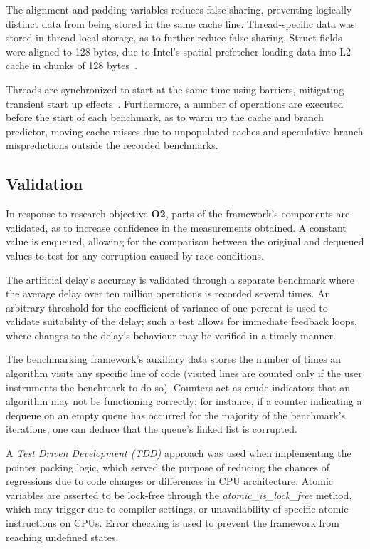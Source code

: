 The alignment and padding variables reduces false sharing, preventing logically
distinct data from being stored in the same cache line.
Thread-specific data was stored in thread local storage, as to further reduce
false sharing. Struct fields were aligned to 128 bytes, due to
Intel's spatial prefetcher loading data into L2
cache in chunks of 128 bytes~\citep[Section~E.2.5.4]{intelmanualoptimization}.

Threads are synchronized to start at the same time using
barriers, mitigating transient start up effects~\citep{hoffman2007baskets}.
Furthermore, a number of operations are executed before the start of each
benchmark, as to warm up the cache and branch predictor, moving cache misses
due to unpopulated caches and speculative branch mispredictions outside the
recorded benchmarks.

\subsection{Validation\label{sec:design_and_implementation_validation}}
In response to research objective \textbf{O2}, parts of the framework's
components are validated, as to increase confidence in the measurements
obtained. A constant value is enqueued, allowing for the comparison
between the original and dequeued values to test for any corruption caused by race conditions. 

The artificial delay's accuracy is validated through a separate
benchmark where the average delay over ten million operations is recorded several times.
An arbitrary threshold for the coefficient of variance of one percent is used
to validate suitability of the delay; such a test allows for immediate feedback
loops, where changes to the delay's behaviour may be verified in a timely
manner.

The benchmarking framework's auxiliary data stores the number of times an
algorithm visits any specific line of code (visited lines are counted only if
the user instruments the benchmark to do so). Counters act as crude indicators that an
algorithm may not be functioning correctly; for instance, if a counter indicating a
dequeue on an empty queue has occurred for the majority of the benchmark's
iterations, one can deduce that the queue's linked list is corrupted. 

A \emph{Test Driven Development (TDD)} approach was used when implementing the
pointer packing logic, which served the purpose of reducing the chances of
regressions due to code changes or differences in CPU architecture. Atomic
variables are asserted to be lock-free through the
\emph{atomic\_is\_lock\_free} method, which may trigger due to compiler settings,
or unavailability of specific atomic instructions on CPUs. Error checking is
used to prevent the framework from reaching undefined states.